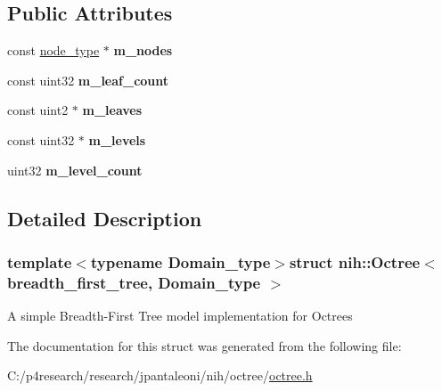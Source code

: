 \subsection*{\-Public \-Attributes}
\begin{DoxyCompactItemize}
\item 
\hypertarget{structnih_1_1_octree_3_01breadth__first__tree_00_01_domain__type_01_4_a5f8bbe5213a3072f140f5f1d8a1c2ab1}{
const \hyperlink{structnih_1_1_octree__node__base}{node\-\_\-type} $\ast$ {\bfseries m\-\_\-nodes}}
\label{structnih_1_1_octree_3_01breadth__first__tree_00_01_domain__type_01_4_a5f8bbe5213a3072f140f5f1d8a1c2ab1}

\item 
\hypertarget{structnih_1_1_octree_3_01breadth__first__tree_00_01_domain__type_01_4_a534d4833d769cfc6494fe02661647d64}{
const uint32 {\bfseries m\-\_\-leaf\-\_\-count}}
\label{structnih_1_1_octree_3_01breadth__first__tree_00_01_domain__type_01_4_a534d4833d769cfc6494fe02661647d64}

\item 
\hypertarget{structnih_1_1_octree_3_01breadth__first__tree_00_01_domain__type_01_4_af85129e934bcc4b1051bb8d8d930f1bb}{
const uint2 $\ast$ {\bfseries m\-\_\-leaves}}
\label{structnih_1_1_octree_3_01breadth__first__tree_00_01_domain__type_01_4_af85129e934bcc4b1051bb8d8d930f1bb}

\item 
\hypertarget{structnih_1_1_octree_3_01breadth__first__tree_00_01_domain__type_01_4_a9ba38aa09710b9179e457a0545cd316b}{
const uint32 $\ast$ {\bfseries m\-\_\-levels}}
\label{structnih_1_1_octree_3_01breadth__first__tree_00_01_domain__type_01_4_a9ba38aa09710b9179e457a0545cd316b}

\item 
\hypertarget{structnih_1_1_octree_3_01breadth__first__tree_00_01_domain__type_01_4_ae0f5f92bbc6184a69e472999d3c50fcf}{
uint32 {\bfseries m\-\_\-level\-\_\-count}}
\label{structnih_1_1_octree_3_01breadth__first__tree_00_01_domain__type_01_4_ae0f5f92bbc6184a69e472999d3c50fcf}

\end{DoxyCompactItemize}


\subsection{\-Detailed \-Description}
\subsubsection*{template$<$typename Domain\-\_\-type$>$struct nih\-::\-Octree$<$ breadth\-\_\-first\-\_\-tree, Domain\-\_\-type $>$}

\-A simple \-Breadth-\/\-First \-Tree model implementation for \-Octrees 

\-The documentation for this struct was generated from the following file\-:\begin{DoxyCompactItemize}
\item 
\-C\-:/p4research/research/jpantaleoni/nih/octree/\hyperlink{octree_8h}{octree.\-h}\end{DoxyCompactItemize}
